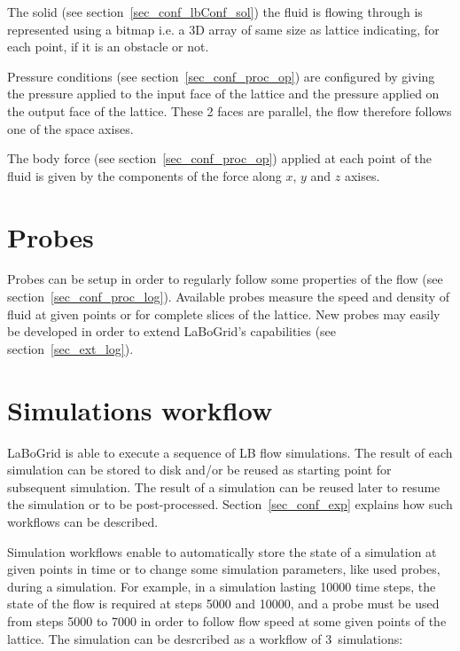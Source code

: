 The solid (see section~\ref{sec_conf_lbConf_sol}) the fluid is flowing through is
represented using a bitmap i.e. a 3D array of same size as lattice indicating,
for each point, if it is an obstacle or not.

Pressure conditions (see section~\ref{sec_conf_proc_op}) are configured by
giving the pressure applied to the input face of the lattice and the pressure
applied on the output face of the lattice. These 2 faces are parallel, the flow
therefore follows one of the space axises.

The body force (see section~\ref{sec_conf_proc_op}) applied at each point of the
fluid is given by the components of the force along $x$, $y$ and $z$ axises.


\section{Probes}
\label{sec_feat_prob}

Probes can be setup in order to regularly follow some properties of the flow
(see section~\ref{sec_conf_proc_log}). Available probes measure the speed and
density of fluid at given points or for complete slices of the lattice. New
probes may easily be developed in order to extend LaBoGrid's capabilities (see
section~\ref{sec_ext_log}).


\section{Simulations workflow}
\label{sec_feat_work}

LaBoGrid is able to execute a sequence of LB flow simulations. The result of
each simulation can be stored to disk and/or be reused as starting point
for subsequent simulation. The result of a simulation can be reused later to
resume the simulation or to be post-processed. Section~\ref{sec_conf_exp}
explains how such workflows can be described.

Simulation workflows enable to automatically store the state of a simulation at
given points in time or to change some simulation parameters, like used probes,
during a simulation. For example, in a simulation lasting 10000 time steps,
the state of the flow is required at steps 5000 and 10000, and a probe must be
used from steps 5000 to 7000 in order to follow flow speed at some given points
of the lattice. The simulation can be desrcribed as a workflow of
3~simulations:

